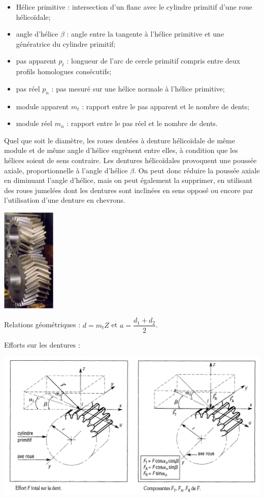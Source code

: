 \documentclass[11pt,oneside]{article}
\begin{document}
\begin{itemize}
\item Hélice primitive : intersection d’un flanc avec le cylindre primitif d’une roue hélicoïdale;
\item angle d’hélice $\beta$ : angle entre la tangente à l’hélice primitive et une génératrice du cylindre primitif;
\item pas apparent $p_t$ : longueur de l’arc de cercle primitif compris entre deux profils homologues consécutifs;
\item pas réel $p_n$ : pas mesuré sur une hélice normale à l’hélice primitive;
\item module apparent $m_t$ : rapport entre le pas apparent et le nombre de dents;
\item module réel $m_n$ : rapport entre le pas réel et le nombre de dents.
\end{itemize}


\begin{minipage}[c]{.65\linewidth}
Quel que soit le diamètre, les roues dentées à denture hélicoïdale de même module et de même angle d’hélice engrènent entre elles, à condition que les hélices soient de sens contraire.
Les dentures hélicoïdales provoquent une poussée axiale, proportionnelle à l’angle d’hélice $\beta$. On peut donc réduire la poussée axiale en diminuant l’angle d’hélice, mais on peut également la supprimer, en utilisant des roues jumelées dont les dentures sont inclinées en sens opposé ou encore par l’utilisation d’une denture en chevrons.
\end{minipage} \hfill
\begin{minipage}[c]{.3\linewidth}
\begin{center}
\includegraphics[height=5cm]{png/fig_69}
\end{center}
\end{minipage}

Relations géométriques : $d=m_t Z$ et $a=\dfrac{d_1+d_2}{2}$.

Efforts sur les dentures : 
\begin{center}
\includegraphics[width=.75\textwidth]{png/fig_70}
\end{center}
\end{document}
